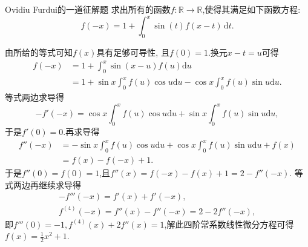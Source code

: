 \documentclass[UTF8,no-math,12pt,openany,table,dvipsnames,svgnames]{book}
\newcommand{\hei}{\CJKfamily{hei}}
\newenvironment{solve}{\par\indent{\hei 解}\hspace{1em}}{\par}
\begin{document}
\begin{MYBOX}[colbacktitle=blue]{Ovidiu Furdui的一道征解题}
求出所有的函数$f:\mathbb R\to\mathbb R$,使得其满足如下函数方程:
\[f(-x)=1+\int_0^x\sin(t)f(x-t)\,\mathrm dt.\]
\tcblower
\begin{solve}
由所给的等式可知$f(x)$具有足够可导性, 且$f(0)=1$.换元$x-t=u$可得
\begin{align*}
f\left( -x \right) &=1+\int_0^x{\sin \left( x-u \right) f\left( u \right) \text{d}u}\\
&=1+\boxed{\sin x\int_0^x{f\left( u \right) \cos u\text{d}u}-\cos x\int_0^x{f\left( u \right) \sin u\text{d}u}}.
\end{align*}
等式两边求导得
\[
-f'\left( -x \right) =\cos x\int_0^x{f\left( u \right) \cos u\text{d}u}+\sin x\int_0^x{f\left( u \right) \sin u\text{d}u},
\]
于是$f'(0)=0$.再求导得
\begin{align*}
f''\left( -x \right) &=\boxed{-\sin x\int_0^x{f\left( u \right) \cos u\text{d}u}+\cos x\int_0^x{f\left( u \right) \sin u\text{d}u}}+f\left( x \right)\\
&=f(x)-f(-x)+1.
\end{align*}
于是$f''(0)=f(0)=1$,且$f''(x)=f(-x)-f(x)+1=2-f''(-x)$. 等式两边再继续求导得
\begin{gather*}
-f'''\left( -x \right) =f'\left( x \right) +f'\left( -x \right) ,\\
f^{\left( 4 \right)}\left( -x \right) =f''\left( x \right) -f''\left( -x \right) =2-2f''\left( -x \right),
\end{gather*}
即$f'''(0)=-1,f^{(4)}(x)+2f''(x)=1$,解此四阶常系数线性微分方程可得$f(x)=\frac12x^2+1$.
\end{solve}
\end{MYBOX}
\end{document}
